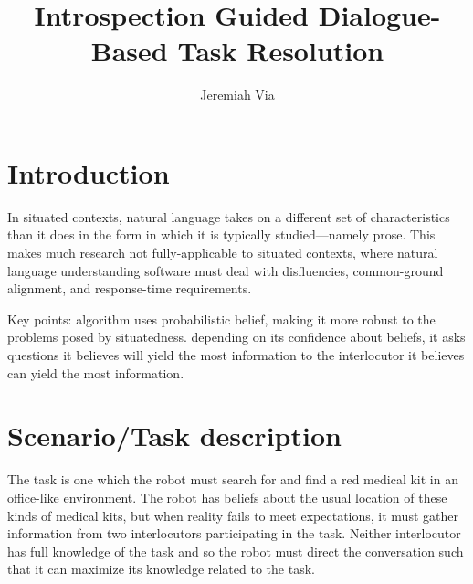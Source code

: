\documentclass[12pt]{article}
\title{Introspection Guided Dialogue-Based Task Resolution}
\author{Jeremiah Via}
\begin{document}
\maketitle

\section{Introduction}

In situated contexts, natural language takes on a different set of
characteristics than it does in the form in which it is typically
studied---namely prose. This makes much research not fully-applicable
to situated contexts, where natural language understanding software
must deal with disfluencies, common-ground alignment, and
response-time requirements.

Key points: algorithm uses probabilistic belief, making it more robust
to the problems posed by situatedness. depending on its confidence
about beliefs, it asks questions it believes will yield the most
information to the interlocutor it believes can yield the most
information.

\section{Scenario/Task description}


The task is one which the robot must search for and find a red medical
kit in an office-like environment. The robot has beliefs about the
usual location of these kinds of medical kits, but when reality fails
to meet expectations, it must gather information from two
interlocutors participating in the task. Neither interlocutor has full
knowledge of the task and so the robot must direct the conversation
such that it can maximize its knowledge related to the task.
\end{document}
